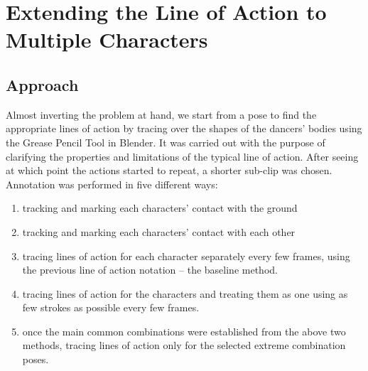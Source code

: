 \chapter{Extending the Line of Action to Multiple Characters}\label{chap:implementation}

\section{Approach}
Almost inverting the problem at hand, we start from a pose to find the appropriate lines of action by tracing over the shapes of the dancers' bodies using the Grease Pencil Tool in Blender. It was carried out with the purpose of clarifying the properties and limitations of the typical line of action. After seeing at which point the actions started to repeat, a shorter sub-clip was chosen. Annotation was performed in five different ways:
\begin{enumerate}
	\item tracking and marking each characters' contact with the ground
	\item tracking and marking each characters' contact with each other
	\item tracing lines of action for each character separately every few frames, using the previous line of action notation -- the baseline method.
	\item tracing lines of action for the characters and treating them as one using as few strokes as possible every few frames.
	\item once the main common combinations were established from the above two methods, tracing lines of action only for the selected extreme combination poses.
\end{enumerate}

